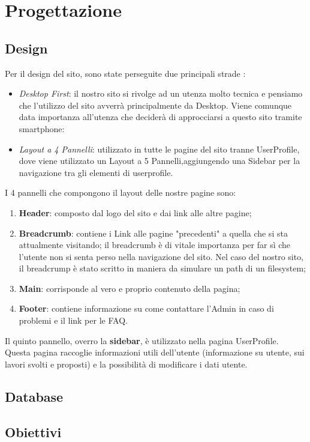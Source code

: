 \section{Progettazione}
	
  \subsection{Design}
  Per il design del sito, sono state perseguite due principali strade :
  \begin{itemize}
    \item \textit{Desktop First}: il nostro sito si rivolge ad un utenza molto tecnica e pensiamo che l'utilizzo del sito avverrà principalmente da Desktop. Viene comunque data importanza all'utenza che deciderà di approcciarsi a questo sito tramite smartphone:
    \item \textit{Layout a 4 Pannelli}: utilizzato in tutte le pagine del sito tranne UserProfile, dove viene utilizzato un Layout a 5 Pannelli,aggiungendo una Sidebar per la navigazione tra gli elementi di userprofile.
  \end{itemize}
  
  I 4 pannelli che compongono il layout delle nostre pagine sono:
  \begin{enumerate}
    \item \textbf{Header}: composto dal logo del sito e dai link alle altre pagine;
    \item \textbf{Breadcrumb}: contiene i Link alle pagine "precedenti" a quella che si sta attualmente visitando; il breadcrumb è di vitale importanza per far sì che l'utente
      non si senta perso nella navigazione del sito. Nel caso del nostro sito, il breadcrump è stato scritto in maniera da simulare un path di un filesystem;
    \item \textbf{Main}: corrisponde al vero e proprio contenuto della pagina;
    \item \textbf{Footer}: contiene informazione su come contattare l'Admin in caso di problemi e il link per le FAQ.
  \end{enumerate}

  Il quinto pannello, overro la \textbf{sidebar}, è utilizzato nella pagina UserProfile. 
  Questa pagina raccoglie informazioni utili dell'utente (informazione su utente, sui lavori svolti e proposti) e la possibilità di modificare i dati utente.


  \subsection{Database}




  \subsection{Obiettivi}
  